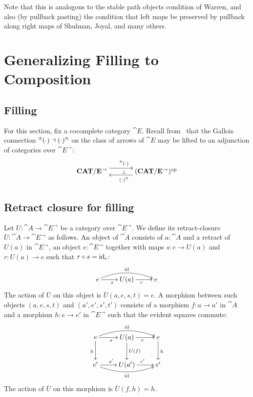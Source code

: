 \documentclass[reqno,10pt,a4paper,oneside]{amsart}
\begin{document}
Note that this is analogous to the stable path objects condition of Warren, and also (by pullback pasting) the condition that left maps be preserved by pullback along right maps of Shulman, Joyal, and many others.

\section{Generalizing Filling to Composition}

\subsection{Filling}

For this section, fix a cocomplete category $\cat{E}$.
Recall from~\cite{garner:small-object-argument} that the Gallois connection $^{\pitchfork}(\mathop{\cdot}) \dashv (\mathop{\cdot})^{\pitchfork}$ on the class of arrows of $\cat{E}$ may be lifted to an adjunction of categories over $\cat{E}^{\to}$:
\begin{equation}
\label{garner-adjunction}
\begin{gathered}
\xymatrix@C+1em{
  \CAT/\cat{E}^{\to}
  \ar@<5pt>[r]^{^{\pitchfork}(\arghole)}
  \ar@{}[r]|{\bot}
&
  (\CAT/\cat{E}^{\to})^{\op}
  \ar@<5pt>[l]^{(\arghole)^{\pitchfork}}
}
\end{gathered}
\end{equation}

\subsection{Retract closure for filling}

Let $U : \cat{A} \to \cat{E}^{\to}$ be a category over $\cat{E}^{\to}$.
We define its retract-closure $\overline{U} : \overline{\cat{A}} \to \cat{E}^{\to}$ as follows.
An object of $\overline{\cat{A}}$ consists of $a : \cat{A}$ and a retract of $U(a)$ in $\cat{E}^{\to}$, \ie an object $e : \cat{E}^{\to}$ together with maps $s : e \to U(a)$ and $r : U(a) \to e$ such that $r \mathbin{\circ} s = \operatorname{id}_e$:
\[
\xymatrix{
  e
  \ar[r]_{s}
  \ar@/^1em/[rr]^{\id}
&
  U(a)
  \ar[r]_{r}
&
  e
}
\]
The action of $\overline{U}$ on this object is $\overline{U}(a, e, s, t) = e$.
A morphism between such objects $(a, e, s, t)$ and $(a', e', s', t')$ consists of a morphism $f : a \to a'$ in $\cat{A}$ and a morphism $h : e \to e'$ in $\cat{E}^{\to}$ such that the evident squares commute:
\[
\xymatrix{
  e
  \ar[r]_{s}
  \ar@/^1em/[rr]^{\id}
  \ar[d]_{h}
&
  U(a)
  \ar[r]_{r}
  \ar[d]^{U(f)}
&
  e
  \ar[d]^{h}
\\
  e'
  \ar[r]^{s'}
  \ar@/_1em/[rr]_{\id}
&
  U(a')
  \ar[r]^{r'}
&
  e'
}
\]
The action of $\overline{U}$ on this morphism is $\overline{U}(f, h) = h$.
\end{document}

